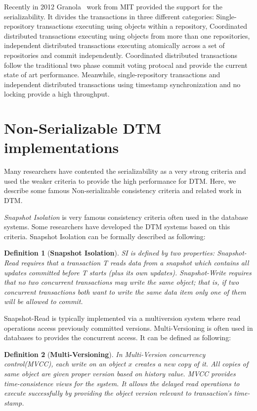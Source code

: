 \documentclass[12pt,english]{report}
\newtheorem{definition}{Definition}[section]
\begin{document}
Recently in 2012 Granola~\cite{cowling2012granola} work from MIT provided the support for the serializability. It divides the transactions in three different categories: Single-repository transactions executing using objects within a repository, Coordinated distributed transactions executing using objects from more than one repositories, independent distributed transactions executing atomically across a set of repositories and commit independently. Coordinated distributed transactions follow the traditional two phase commit voting protocal and provide the current state of art performance. Meanwhile, single-repository transactions and independent distributed transactions using timestamp synchronization and no locking provide a high throughput.   

\section{Non-Serializable DTM implementations}

Many researchers have contented the serializability as a very strong criteria and used the weaker criteria to provide the high performance for DTM. Here, we describe some famous Non-serializable consistency criteria and  related work in DTM. 

\textit{Snapshot Isolation} is very famous consistency criteria often used in the database systems. Some researchers have developed the DTM systems based on this criteria. Snapshot Isolation can be formally described as following:

\begin{definition}[\textbf{Snapshot Isolation}]
SI is defined by two properties: \textit{Snapshot-Read} requires that a transaction T reads data from a snapshot which contains all updates committed before T starts (plus its own updates). \textit{Snapshot-Write} requires that no two concurrent transactions may write the same object; that is, if two concurrent transactions both want to write the same data item only one of them will be allowed to commit.
\end{definition}

Snapshot-Read is typically implemented via a multiversion system where read operations access previously committed versions. Multi-Versioning is often used in databases to provides the concurrent access. It can be defined as following:
\begin{definition}[\textbf{Multi-Versioning}]
In Multi-Version concurrency control(MVCC), each write on an object $x$ creates a new copy of it. All copies of same object are given proper version based on history value. MVCC provides time-consistence views for the system. It allows the delayed read operations to execute successfully by providing the object version relevant to transaction's time-stamp. 
\end{definition}
\end{document}
